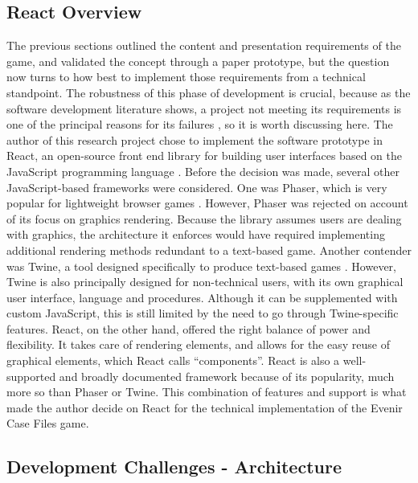 \documentclass{l4proj}
\begin{document}
\subsection{React Overview}

The previous sections outlined the content and presentation requirements of the game, and validated the concept through a paper prototype, but the question now turns to how best to implement those requirements from a technical standpoint. The robustness of this phase of development is crucial, because as the software development literature shows, a project not meeting its requirements is one of the principal reasons for its failures \citep{schwaber2002agile}, so it is worth discussing here.  The author of this research project chose to implement the software prototype in React, an open-source front end library for building user interfaces based on the JavaScript programming language \citep{react}. Before the decision was made, several other JavaScript-based frameworks were considered. One was Phaser, which is very popular for lightweight browser games \citep{phaser}. However, Phaser was rejected on account of its focus on graphics rendering. Because the library assumes users are dealing with graphics, the architecture it enforces would have required implementing additional rendering methods redundant to a text-based game. Another contender was Twine, a tool designed specifically to produce text-based games \citep{twine}. However, Twine is also principally designed for non-technical users, with its own graphical user interface, language and procedures. Although it can be supplemented with custom JavaScript, this is still limited by the need to go through Twine-specific features. React, on the other hand, offered the right balance of power and flexibility. It takes care of rendering elements, and allows for the easy reuse of graphical elements, which React calls “components”. React is also a well-supported and broadly documented framework because of its popularity, much more so than Phaser or Twine. This combination of features and support is what made the author decide on React for the technical implementation of the Evenir Case Files game. 

\subsection{Development Challenges - Architecture}
\end{document}

